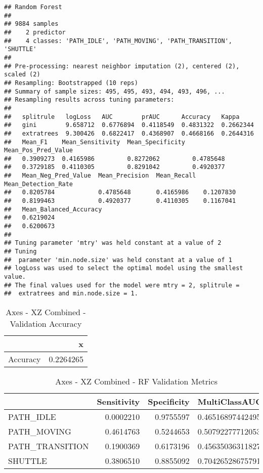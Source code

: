 \documentclass[]{article}
\begin{document}
\begin{verbatim}
## Random Forest 
## 
## 9884 samples
##    2 predictor
##    4 classes: 'PATH_IDLE', 'PATH_MOVING', 'PATH_TRANSITION', 'SHUTTLE' 
## 
## Pre-processing: nearest neighbor imputation (2), centered (2), scaled (2) 
## Resampling: Bootstrapped (10 reps) 
## Summary of sample sizes: 495, 495, 493, 494, 493, 496, ... 
## Resampling results across tuning parameters:
## 
##   splitrule   logLoss   AUC        prAUC      Accuracy   Kappa    
##   gini        9.658712  0.6776894  0.4118549  0.4831322  0.2662344
##   extratrees  9.300426  0.6822417  0.4368907  0.4668166  0.2644316
##   Mean_F1    Mean_Sensitivity  Mean_Specificity  Mean_Pos_Pred_Value
##   0.3909273  0.4165986         0.8272062         0.4785648          
##   0.3729185  0.4110305         0.8291042         0.4920377          
##   Mean_Neg_Pred_Value  Mean_Precision  Mean_Recall  Mean_Detection_Rate
##   0.8205784            0.4785648       0.4165986    0.1207830          
##   0.8199463            0.4920377       0.4110305    0.1167041          
##   Mean_Balanced_Accuracy
##   0.6219024             
##   0.6200673             
## 
## Tuning parameter 'mtry' was held constant at a value of 2
## Tuning
##  parameter 'min.node.size' was held constant at a value of 1
## logLoss was used to select the optimal model using the smallest value.
## The final values used for the model were mtry = 2, splitrule =
##  extratrees and min.node.size = 1.
\end{verbatim}

\begin{table}[!h]

\caption{\label{tab:sensor-xz-combined-rf-results}Axes - XZ Combined - Validation Accuracy}
\centering
\begin{tabular}[t]{lr}
\toprule
  & x\\
\midrule
Accuracy & 0.2264265\\
\bottomrule
\end{tabular}
\end{table}

\begin{table}[!h]

\caption{\label{tab:sensor-xz-combined-rf-results}Axes - XZ Combined - RF Validation Metrics}
\centering
\begin{tabular}[t]{lrrl}
\toprule
  & Sensitivity & Specificity & MultiClassAUC\\
\midrule
PATH\_IDLE & 0.0002210 & 0.9755597 & 0.465168974424957\\
PATH\_MOVING & 0.4614763 & 0.5244653 & 0.507922777120533\\
PATH\_TRANSITION & 0.1900369 & 0.6173196 & 0.456350363118275\\
SHUTTLE & 0.3806510 & 0.8855092 & 0.70426528675791\\
\bottomrule
\end{tabular}
\end{table}
\end{document}
